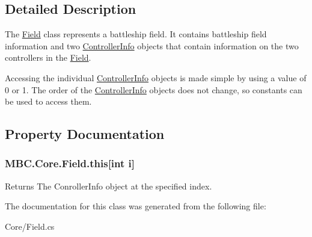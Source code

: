 \subsection{Detailed Description}
The \hyperlink{class_m_b_c_1_1_core_1_1_field}{Field} class represents a battleship field. It contains battleship field information and two \hyperlink{class_m_b_c_1_1_core_1_1_field_1_1_controller_info}{Controller\-Info} objects that contain information on the two controllers in the \hyperlink{class_m_b_c_1_1_core_1_1_field}{Field}. 

Accessing the individual \hyperlink{class_m_b_c_1_1_core_1_1_field_1_1_controller_info}{Controller\-Info} objects is made simple by using a value of 0 or 1. The order of the \hyperlink{class_m_b_c_1_1_core_1_1_field_1_1_controller_info}{Controller\-Info} objects does not change, so constants can be used to access them.

\subsection{Property Documentation}
\hypertarget{class_m_b_c_1_1_core_1_1_field_a83df6dda4d27fbd795656ded76db38c9}{
\subsubsection[{this[int i]}]{ M\-B\-C.\-Core.\-Field.\-this\mbox{[}int i\mbox{]}\hspace{0.3cm}{\ttfamily [get]}}}\label{class_m_b_c_1_1_core_1_1_field_a83df6dda4d27fbd795656ded76db38c9}
\begin{DoxyReturn}{Returns}
The Conroller\-Info object at the specified index.
\end{DoxyReturn}


The documentation for this class was generated from the following file\-:\begin{DoxyCompactItemize}
\item 
Core/Field.\-cs\end{DoxyCompactItemize}
